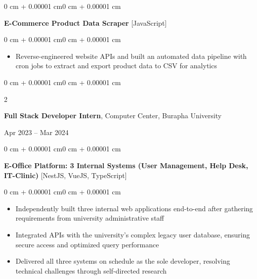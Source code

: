 \documentclass[10pt, letterpaper]{article}
\newenvironment{highlights}{
    \begin{itemize}[
        topsep=0.06 cm,
        parsep=0.06 cm,
        partopsep=0pt,
        itemsep=0pt,
        leftmargin=0.4 cm + 10pt
    ]
}{
    \end{itemize}
}
\newenvironment{onecolentry}{
    \begin{adjustwidth}{0 cm + 0.00001 cm}{0 cm + 0.00001 cm}
}{
    \end{adjustwidth}
}
\newenvironment{twocolentry}[2][]{
    \onecolentry
    \def\secondColumn{#2}
    \setcolumnwidth{\fill, 4.5 cm}
    \begin{paracol}{2}
}{
    \switchcolumn \raggedleft \secondColumn
    \end{paracol}
    \endonecolentry
}
\begin{document}
        \vspace{0.22 cm}
        \begin{onecolentry}
            \textbf{E-Commerce Product Data Scraper} [JavaScript]
        \end{onecolentry}

        \vspace{0.10 cm}
        \begin{onecolentry}
            \begin{highlights}
                \item Reverse-engineered website APIs and built an automated data pipeline with cron jobs to extract and export product data to CSV for analytics
            \end{highlights}
        \end{onecolentry}


        \vspace{0.36 cm}

        \begin{twocolentry}{
            Apr 2023 -- Mar 2024
        }
            \large\textbf{Full Stack Developer Intern}, Computer Center, Burapha University
        \end{twocolentry}

        \vspace{0.10 cm}
        \begin{onecolentry}
            \textbf{E-Office Platform: 3 Internal Systems (User Management, Help Desk, IT-Clinic)} [NestJS, VueJS, TypeScript]
        \end{onecolentry}

        \vspace{0.10 cm}
        \begin{onecolentry}
            \begin{highlights}
                \item Independently built three internal web applications end-to-end after gathering requirements from university administrative staff
                \item Integrated APIs with the university's complex legacy user database, ensuring secure access and optimized query performance
                \item Delivered all three systems on schedule as the sole developer, resolving technical challenges through self-directed research
            \end{highlights}
        \end{onecolentry}
\end{document}
